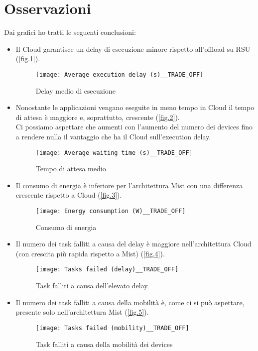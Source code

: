 \documentclass[12pt, a4paper]{report} %
\begin{document}
\section*{Osservazioni}
Dai grafici ho tratti le seguenti conclusioni:
\begin{itemize}
	\item Il Cloud garantisce un delay di esecuzione minore rispetto all'offload su RSU (\autoref{fig.1}).
	\begin{figure}[!ht]
	\caption{Delay medio di esecuzione}
	\texttt{[image: Average execution delay (s)\_\_TRADE\_OFF]}
	\centering
	\label{fig.1}
	\end{figure}
	\item  Nonostante le applicazioni vengano eseguite in meno tempo in Cloud il tempo di attesa è maggiore e, soprattutto, crescente  (\autoref{fig.2}).\\
	Ci possiamo aspettare che aumenti con l'aumento del numero dei devices fino a rendere nulla il vantaggio che ha il Cloud sull'execution delay.
	\begin{figure}[!ht]
		\caption{Tempo di attesa medio}
		\texttt{[image: Average waiting time (s)\_\_TRADE\_OFF]}
		\centering
		\label{fig.2}
	\end{figure}
	\item  Il consumo di energia è inferiore per l'architettura Mist con una differenza crescente rispetto a Cloud (\autoref{fig.3}).
	\begin{figure}[!ht]
		\caption{Consumo di energia}
		\texttt{[image: Energy consumption (W)\_\_TRADE\_OFF]}
		\centering
		\label{fig.3}
	\end{figure}
	\item  Il numero dei task falliti a causa del delay è maggiore nell'architettura Cloud (con crescita più rapida rispetto a Mist) (\autoref{fig.4}).
	\begin{figure}[!ht]
		\caption{Task falliti a causa dell'elevato delay}
		\texttt{[image: Tasks failed (delay)\_\_TRADE\_OFF]}
		\centering
		\label{fig.4}
	\end{figure}
	\item Il numero dei task falliti a causa della mobilità è, come ci si può aspettare, presente solo nell'architettura Mist (\autoref{fig.5}).
	\begin{figure}[!ht]
		\caption{Task falliti a causa della mobilità dei devices}
		\texttt{[image: Tasks failed (mobility)\_\_TRADE\_OFF]}
		\centering
		\label{fig.5}
	\end{figure}

\end{itemize}
\end{document}
